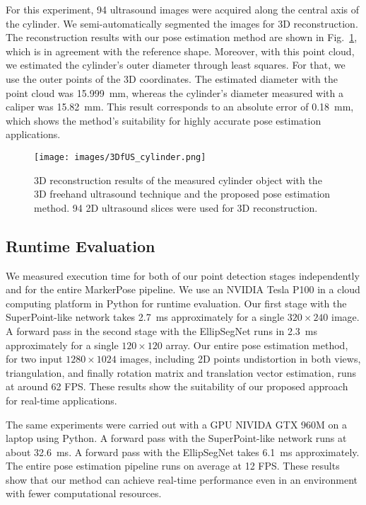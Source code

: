 \documentclass[final]{cvpr}
\begin{document}
For this experiment, 94 ultrasound images were acquired along the central axis of the cylinder. We semi-automatically segmented the images for 3D reconstruction. The reconstruction results with our pose estimation method are shown in Fig.~\ref{fig:3DfUS_cylinder_reconstruction}, which is in agreement with the reference shape. Moreover, with this point cloud, we estimated the cylinder's outer diameter through least squares. For that, we use the outer points of the 3D coordinates. The estimated diameter with the point cloud was 15.999~mm, whereas the cylinder's diameter measured with a caliper was 15.82~mm. This result corresponds to an absolute error of 0.18~mm, which shows the method's suitability for highly accurate pose estimation applications.


\begin{figure}[h]
    \centering
    \texttt{[image: images/3DfUS\_cylinder.png]}
    \caption{3D reconstruction results of the measured cylinder object with the 3D freehand ultrasound technique and the proposed pose estimation method. 94 2D ultrasound slices were used for 3D reconstruction.}
    \label{fig:3DfUS_cylinder_reconstruction}
\end{figure}



\subsection{Runtime Evaluation}
We measured execution time for both of our point detection stages independently and for the entire MarkerPose pipeline. We use an NVIDIA Tesla P100 in a cloud computing platform in Python for runtime evaluation. Our first stage with the SuperPoint-like network takes 2.7~ms approximately for a single $320\times 240$ image. A forward pass in the second stage with the EllipSegNet runs in 2.3~ms approximately for a single $120\times 120$ array. Our entire pose estimation method, for two input $1280\times 1024$ images, including 2D points undistortion in both views, triangulation, and finally rotation matrix and translation vector estimation, runs at around 62 FPS. These results show the suitability of our proposed approach for real-time applications.

The same experiments were carried out with a GPU NIVIDA GTX 960M on a laptop using Python. A forward pass with the SuperPoint-like network runs at about 32.6~ms. A forward pass with the EllipSegNet takes 6.1~ms approximately. The entire pose estimation pipeline runs on average at 12 FPS. These results show that our method can achieve real-time performance even in an environment with fewer computational resources.
\end{document}

